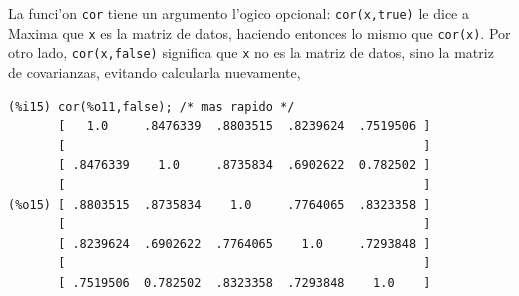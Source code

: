 \documentclass[spanish,12pt,a4paper]{article}
\begin{document}
\begin{description}
La funci'on \verb|cor| tiene un argumento l'ogico opcional: \verb|cor(x,true)| le dice a Maxima que \verb|x| es la matriz de datos, haciendo entonces lo mismo que \verb|cor(x)|. Por otro lado, \verb|cor(x,false)| significa que \verb|x| no es la matriz de datos, sino la matriz de covarianzas, evitando calcularla nuevamente,
\begin{verbatim}
(%i15) cor(%o11,false); /* mas rapido */
       [   1.0     .8476339  .8803515  .8239624  .7519506 ]
       [                                                  ]
       [ .8476339    1.0     .8735834  .6902622  0.782502 ]
       [                                                  ]
(%o15) [ .8803515  .8735834    1.0     .7764065  .8323358 ]
       [                                                  ]
       [ .8239624  .6902622  .7764065    1.0     .7293848 ]
       [                                                  ]
       [ .7519506  0.782502  .8323358  .7293848    1.0    ]
\end{verbatim}


\end{description}
\end{document}
